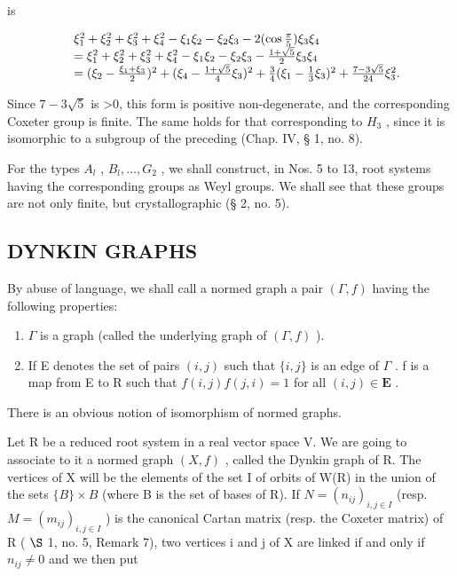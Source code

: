 is

\[
\begin{array}{r l} & \xi_ {1} ^ {2} + \xi_ {2} ^ {2} + \xi_ {3} ^ {2} + \xi_ {4} ^ {2} - \xi_ {1} \xi_ {2} - \xi_ {2} \xi_ {3} - 2 (\cos \frac {\pi}{5}) \xi_ {3} \xi_ {4} \\ & = \xi_ {1} ^ {2} + \xi_ {2} ^ {2} + \xi_ {3} ^ {2} + \xi_ {4} ^ {2} - \xi_ {1} \xi_ {2} - \xi_ {2} \xi_ {3} - \frac {1 + \sqrt {5}}{2} \xi_ {3} \xi_ {4} \\ & = (\xi_ {2} - \frac {\xi_ {1} + \xi_ {3}}{2}) ^ {2} + (\xi_ {4} - \frac {1 + \sqrt {5}}{4} \xi_ {3}) ^ {2} + \frac {3}{4} (\xi_ {1} - \frac {1}{3} \xi_ {3}) ^ {2} + \frac {7 - 3 \sqrt {5}}{24} \xi_ {3} ^ {2}. \end{array}
\]

Since \(7 - 3\sqrt{5}\) is \textgreater0, this form is positive non-degenerate, and the corresponding Coxeter group is finite. The same holds for that corresponding to \(H_{3}\) , since it is isomorphic to a subgroup of the preceding (Chap. IV, § 1, no. 8).

For the types \(A_{l}\) , \(B_{l}, \ldots, G_{2}\) , we shall construct, in Nos. 5 to 13, root systems having the corresponding groups as Weyl groups. We shall see that these groups are not only finite, but crystallographic (§ 2, no. 5).

\subsection{DYNKIN GRAPHS}

By abuse of language, we shall call a normed graph a pair \((\Gamma, f)\) having the following properties:

\begin{enumerate}
\def\labelenumi{\arabic{enumi})}
\item
  \(\Gamma\) is a graph (called the underlying graph of \((\Gamma, f)\) ).
\item
  If E denotes the set of pairs \((i,j)\) such that \(\{i,j\}\) is an edge of \(\Gamma\) . f is a map from E to R such that \(f(i,j)f(j,i)=1\) for all \((i,j)\in\mathbf{E}\) .
\end{enumerate}

There is an obvious notion of isomorphism of normed graphs.

Let R be a reduced root system in a real vector space V. We are going to associate to it a normed graph \((X, f)\) , called the Dynkin graph of R. The vertices of X will be the elements of the set I of orbits of W(R) in the union of the sets \(\{B\} \times B\) (where B is the set of bases of R). If \(N = (n_{ij})_{i,j \in I}\) (resp. \(M = (m_{ij})_{i,j \in I}\) ) is the canonical Cartan matrix (resp. the Coxeter matrix) of R ( \(\S\) 1, no. 5, Remark 7), two vertices i and j of X are linked if and only if \(n_{ij} \neq 0\) and we then put

